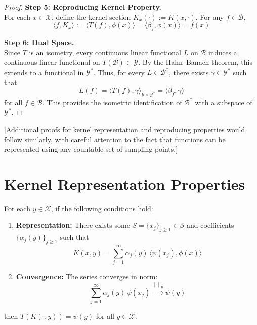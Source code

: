 \begin{proof}
\medskip
\noindent\textbf{Step 5: Reproducing Kernel Property.} \\
For each $x\in\mathcal{X}$, define the kernel section $K_x(\cdot) := K(x,\cdot)$. For any $f\in\mathcal{B}$,
\begin{equation}
\langle f, K_x \rangle := \langle T(f), \phi(x) \rangle = \langle \beta_f, \phi(x)\rangle = f(x)
\end{equation}

\medskip
\noindent\textbf{Step 6: Dual Space.} \\
Since $T$ is an isometry, every continuous linear functional $L$ on $\mathcal{B}$ induces a continuous linear functional on $T(\mathcal{B})\subset \mathcal{Y}$. By the Hahn--Banach theorem, this extends to a functional in $\mathcal{Y}^*$. Thus, for every $L \in \mathcal{B}^*$, there exists $\gamma\in \mathcal{Y}^*$ such that
\begin{equation}
L(f) = \langle T(f), \gamma \rangle_{\mathcal{Y}\times\mathcal{Y}^*} = \langle \beta_f, \gamma \rangle
\end{equation}
for all $f \in \mathcal{B}$. This provides the isometric identification of $\mathcal{B}^*$ with a subspace of $\mathcal{Y}^*$.
\end{proof}

[Additional proofs for kernel representation and reproducing properties would follow similarly, with careful attention to the fact that functions can be represented using any countable set of sampling points.]

\section{Kernel Representation Properties}

\begin{theorem}
For each $y \in \mathcal{X}$, if the following conditions hold:
\begin{enumerate}
\item \textbf{Representation:} There exists some $S = \{x_j\}_{j\ge1} \in \mathcal{S}$ and coefficients $\{\alpha_j(y)\}_{j\ge1}$ such that
\begin{equation}
K(x,y) = \sum_{j=1}^\infty \alpha_j(y)\, \langle \psi(x_j), \phi(x)\rangle
\end{equation}

\item \textbf{Convergence:} The series converges in norm:
\begin{equation}
\sum_{j=1}^\infty \alpha_j(y)\, \psi(x_j) \xrightarrow{||\cdot||_{\mathcal{Y}}} \psi(y)
\end{equation}

\end{enumerate}
then $T(K(\cdot,y)) = \psi(y)$ for all $y \in \mathcal{X}$.
\end{theorem}

